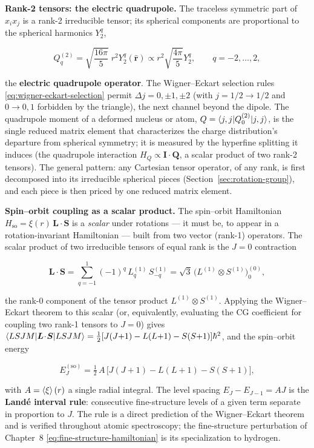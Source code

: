 \medskip\noindent\textbf{Rank-2 tensors: the electric quadrupole.} The traceless symmetric part of $x_{i}x_{j}$ is a rank-2 irreducible tensor; its spherical components are proportional to the spherical harmonics $Y_{2}^{q}$,
\begin{linenomath}
  \begin{equation}
    Q^{(2)}_{q}=\sqrt{\frac{16\pi}{5}}\;r^{2}Y_{2}^{q}(\hat{\bm r})\propto r^{2}\sqrt{\frac{4\pi}{5}}Y_{2}^{q},\qquad q=-2,\ldots,2,
    \label{eq:quadrupole-tensor}
  \end{equation}
\end{linenomath}
the \textbf{electric quadrupole operator}. The Wigner--Eckart selection rules \eqref{eq:wigner-eckart-selection} permit $\Delta j=0,\pm1,\pm2$ (with $j=1/2\to1/2$ and $0\to0,1$ forbidden by the triangle), the next channel beyond the dipole. The quadrupole moment of a deformed nucleus or atom, $Q=\braket{j,j|Q^{(2)}_{0}|j,j}$, is the single reduced matrix element that characterizes the charge distribution's departure from spherical symmetry; it is measured by the hyperfine splitting it induces (the quadrupole interaction $H_{Q}\propto\bm I\cdot\bm Q$, a scalar product of two rank-2 tensors). The general pattern: any Cartesian tensor operator, of any rank, is first decomposed into its irreducible spherical pieces (Section~\ref{sec:rotation-group}), and each piece is then priced by one reduced matrix element.

\medskip\noindent\textbf{Spin--orbit coupling as a scalar product.} The spin--orbit Hamiltonian $H_{\mathrm{so}}=\xi(r)\,\bm L\!\cdot\!\bm S$ is a \emph{scalar} under rotations --- it must be, to appear in a rotation-invariant Hamiltonian --- built from two vector (rank-1) operators. The scalar product of two irreducible tensors of equal rank is the $J=0$ contraction
\begin{linenomath}
  \begin{equation}
    \bm L\!\cdot\!\bm S=\sum_{q=-1}^{1}(-1)^{q}\,L^{(1)}_{q}\,S^{(1)}_{-q}=\sqrt{3}\,\bigl(L^{(1)}\otimes S^{(1)}\bigr)^{(0)}_{0},
    \label{eq:scalar-product}
  \end{equation}
\end{linenomath}
the rank-0 component of the tensor product $L^{(1)}\otimes S^{(1)}$. Applying the Wigner--Eckart theorem to this scalar (or, equivalently, evaluating the CG coefficient for coupling two rank-1 tensors to $J=0$) gives $\braket{LSJM|\bm L\!\cdot\!\bm S|LSJM}=\tfrac12[J(J{+}1)-L(L{+}1)-S(S{+}1)]\hbar^{2}$, and the spin--orbit energy
\begin{linenomath}
  \begin{equation}
    E_{J}^{\mathrm{(so)}}=\tfrac12\,A\,\bigl[J(J{+}1)-L(L{+}1)-S(S{+}1)\bigr],
    \label{eq:lande-interval}
  \end{equation}
\end{linenomath}
with $A=\braket\xi(r)$ a single radial integral. The level spacing $E_{J}-E_{J-1}=AJ$ is the \textbf{Land\'e interval rule}: consecutive fine-structure levels of a given term separate in proportion to $J$. The rule is a direct prediction of the Wigner--Eckart theorem and is verified throughout atomic spectroscopy; the fine-structure perturbation of Chapter~8 \eqref{eq:fine-structure-hamiltonian} is its specialization to hydrogen.

